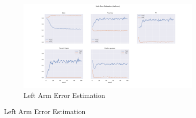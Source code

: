 \begin{figure}
  \hfill
  \begin{subfigure}[b]{0.9\linewidth}
      \centering
      \includegraphics[width=\textwidth]{figures/Results/lb/LimbErrorEstimation_Left arm.png}
      \caption{Left Arm Error Estimation}
      \label{fig:lear_lb_ee}
  \end{subfigure}
\end{figure}

